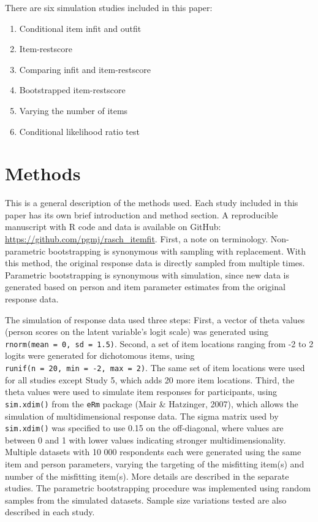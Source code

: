 \documentclass[
  letterpaper,
  DIV=11,
  numbers=noendperiod]{scrartcl}
\providecommand{\tightlist}{%
  \setlength{\itemsep}{0pt}\setlength{\parskip}{0pt}}\usepackage{longtable,booktabs,array}
\begin{document}
There are six simulation studies included in this paper:

\begin{enumerate}
\def\labelenumi{\arabic{enumi}.}
\tightlist
\item
  Conditional item infit and outfit
\item
  Item-restscore
\item
  Comparing infit and item-restscore
\item
  Bootstrapped item-restscore
\item
  Varying the number of items
\item
  Conditional likelihood ratio test
\end{enumerate}

\section{Methods}\label{methods}

This is a general description of the methods used. Each study included
in this paper has its own brief introduction and method section. A
reproducible manuscript with R code and data is available on GitHub:
\url{https://github.com/pgmj/rasch_itemfit}. First, a note on
terminology. Non-parametric bootstrapping is synonymous with sampling
with replacement. With this method, the original response data is
directly sampled from multiple times. Parametric bootstrapping is
synonymous with simulation, since new data is generated based on person
and item parameter estimates from the original response data.

The simulation of response data used three steps: First, a vector of
theta values (person scores on the latent variable's logit scale) was
generated using \texttt{rnorm(mean\ =\ 0,\ sd\ =\ 1.5)}. Second, a set
of item locations ranging from -2 to 2 logits were generated for
dichotomous items, using
\texttt{runif(n\ =\ 20,\ min\ =\ -2,\ max\ =\ 2)}. The same set of item
locations were used for all studies except Study 5, which adds 20 more
item locations. Third, the theta values were used to simulate item
responses for participants, using \texttt{sim.xdim()} from the
\texttt{eRm} package (Mair \& Hatzinger, 2007), which allows the
simulation of multidimensional response data. The sigma matrix used by
\texttt{sim.xdim()} was specified to use 0.15 on the off-diagonal, where
values are between 0 and 1 with lower values indicating stronger
multidimensionality. Multiple datasets with 10 000 respondents each were
generated using the same item and person parameters, varying the
targeting of the misfitting item(s) and number of the misfitting
item(s). More details are described in the separate studies. The
parametric bootstrapping procedure was implemented using random samples
from the simulated datasets. Sample size variations tested are also
described in each study.
\end{document}
